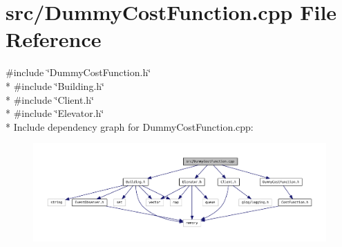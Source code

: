 \section{src/\+Dummy\+Cost\+Function.cpp File Reference}
\label{_dummy_cost_function_8cpp}
{\ttfamily \#include \char`\"{}Dummy\+Cost\+Function.\+h\char`\"{}}\\*
{\ttfamily \#include \char`\"{}Building.\+h\char`\"{}}\\*
{\ttfamily \#include \char`\"{}Client.\+h\char`\"{}}\\*
{\ttfamily \#include \char`\"{}Elevator.\+h\char`\"{}}\\*
Include dependency graph for Dummy\+Cost\+Function.\+cpp\+:\nopagebreak
\begin{figure}[H]
\begin{center}
\leavevmode
\includegraphics[width=350pt]{_dummy_cost_function_8cpp__incl}
\end{center}
\end{figure}
